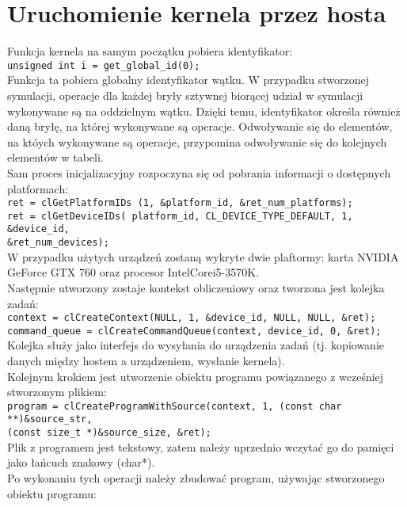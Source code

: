 \section{Uruchomienie kernela przez hosta}
Funkcja kernela na samym początku pobiera identyfikator: \\
\verb$unsigned int i = get_global_id(0);$\\
Funkcja ta pobiera globalny identyfikator wątku. W przypadku stworzonej symulacji, operacje dla każdej bryły sztywnej biorącej udział w symulacji wykonywane są na oddzielnym wątku. Dzięki temu, identyfikator określa również daną bryłę, na której wykonywane są operacje. Odwoływanie się do elementów, na któych wykonywane są operacje, przypomina odwoływanie się do kolejnych elementów w tabeli. \\
Sam proces inicjalizacyjny rozpoczyna się od pobrania informacji o dostępnych platformach:\\
\verb+ret = clGetPlatformIDs (1, &platform_id, &ret_num_platforms);+\\
\verb+ret = clGetDeviceIDs( platform_id, CL_DEVICE_TYPE_DEFAULT, 1, &device_id,+ \\
\verb+&ret_num_devices);+\\ 
W przypadku użytych urządzeń zostaną wykryte dwie plaftormy: karta NVIDIA GeForce GTX 760 oraz procesor Intel\textregistered Core\texttrademark i5-3570K. \\ 
Następnie utworzony zostaje kontekst obliczeniowy oraz tworzona jest kolejka zadań:\\
\verb+context = clCreateContext(NULL, 1, &device_id, NULL, NULL, &ret);+\\
\verb+command_queue = clCreateCommandQueue(context, device_id, 0, &ret);+\\
Kolejka służy jako interfejs do wysyłania do urządzenia zadań (tj. kopiowanie danych między hostem a urządzeniem, wysłanie kernela). \\
Kolejnym krokiem jest utworzenie obiektu programu powiązanego z wcześniej stworzonym plikiem:\\
\verb+program = clCreateProgramWithSource(context, 1, (const char **)&source_str,+\\
\verb+(const size_t *)&source_size, &ret);+\\
Plik z programem jest tekstowy, zatem należy uprzednio wczytać go do pamięci jako łańcuch znakowy (char*). \\
Po wykonaniu tych operacji należy zbudować program, używając stworzonego obiektu programu:\\
